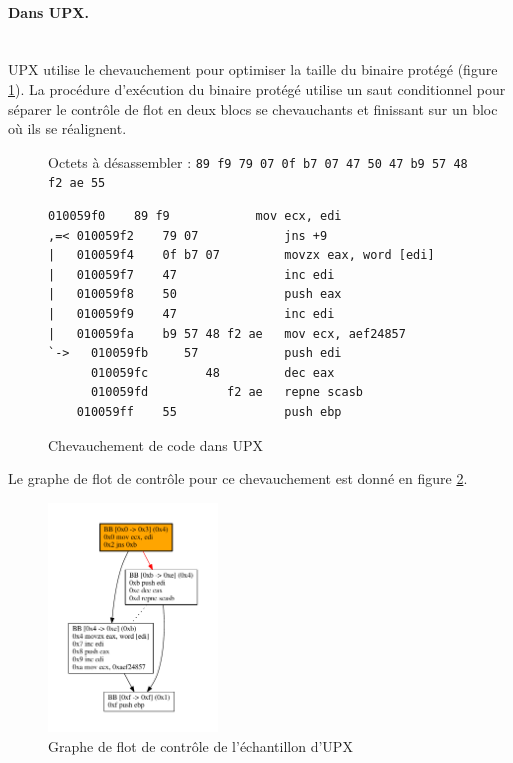 \paragraph{Dans UPX.}
~\\
UPX utilise le chevauchement pour optimiser la taille du binaire protégé (figure \ref{fig:upx_obf_disas}).
La procédure d'exécution du binaire protégé utilise un saut conditionnel pour séparer le contrôle de flot en deux blocs se chevauchants et finissant sur un bloc où ils se réalignent.
\begin{figure}
Octets à désassembler : \texttt{89 f9 79 07 0f b7 07 47 50 47 b9 57 48 f2 ae 55}
\begin{lstlisting}[language={[x86masm]Assembler}, escapechar=~]
    010059f0    89 f9            mov ecx, edi
,=< 010059f2    79 07            jns +9
|   010059f4    0f b7 07         movzx eax, word [edi]
|   010059f7    47               inc edi
|   010059f8    50               push eax
|   010059f9    47               inc edi
|   010059fa    b9 57 48 f2 ae   mov ecx, aef24857
`->   010059fb     57            push edi
      010059fc        48         dec eax
      010059fd           f2 ae   repne scasb
    010059ff    55               push ebp
\end{lstlisting}
\caption{Chevauchement de code dans UPX\label{fig:upx_obf_disas}}
\end{figure}
Le graphe de flot de contrôle pour ce chevauchement est donné en figure \ref{fig:upx_cfg}.

\begin{figure}
\begin{center}
\includegraphics[width=0.4\textwidth]{supports/disasm/upx/upx.pdf}
\end{center}
\caption{Graphe de flot de contrôle de l'échantillon d'UPX}
\label{fig:upx_cfg}
\end{figure}

